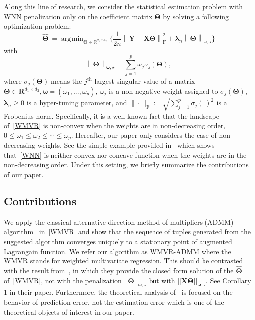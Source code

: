 \documentclass[alpha-refs]{wiley-article}
\DeclareMathOperator*{\argmin}{\arg\!\min}
\begin{document}
Along this line of research, we consider the statistical estimation problem with WNN penalization only on the coefficient matrix $\boldsymbol{\Theta}$ by solving a following optimization problem:
\begin{equation}  \label{WMVR}
    \widehat{\boldsymbol{\Theta}} := \argmin_{\boldsymbol{\Theta}\in\mathbb{R}^{d_{1}\times d_{2}}} \bigg\{ \frac{1}{2n} \left\| \boldsymbol{Y}-\boldsymbol{X}\boldsymbol{\Theta} \right\|_{\text{F}}^{2} + \boldsymbol{\lambda}_{n} \left\| \boldsymbol{\Theta}\right\|_{\boldsymbol{\omega,\star}} \bigg\}
\end{equation}
with
\begin{equation} \label{WNN}
     \left\| \boldsymbol{\Theta} \right\|_{\boldsymbol{\omega,\star}} =\sum^{p}_{j=1} \omega_{j}\sigma_{j}(\boldsymbol{\Theta}),
\end{equation}
where $\sigma_{j}(\boldsymbol{\Theta})$ means the $j^{\text{th}}$ largest singular value of a matrix $\boldsymbol{\Theta} \in \boldsymbol{R}^{d_{1} \times d_{2}}, \boldsymbol{\omega} = (\omega_{1}, ..., \omega_{p}),\ \omega_{j}$ is a non-negative weight assigned to $\sigma_{j}(\boldsymbol{\Theta})$, $\boldsymbol{\lambda}_{n}\geq 0$ is a hyper-tuning parameter, and $\| \cdot \|_{\text{F}}:=\sqrt{\sum_{j=1}^{p}\sigma_{j}(\cdot)^{2}}$ is a Frobenius norm.
Specifically, it is a well-known fact that the landscape of~\eqref{WMVR} is non-convex when the weights are in non-decreasing order, $0\leq\omega_{1}\leq\omega_{2}\leq\cdots\leq\omega_{p}$.
Hereafter, our paper only considers the case of non-decreasing weights.
See the simple example provided in~\citet{chen2013reduced} which shows that~\eqref{WNN} is neither convex nor concave function when the weights are in the non-decreasing order.
Under this setting, we briefly summarize the contributions of our paper.

\subsection{Contributions}
We apply the classical alternative direction method of multipliers (ADMM) algorithm~\citep{boyd2011distributed} in~\eqref{WMVR} and show that the sequence of tuples generated from the suggested algorithm converges uniquely to a stationary point of augmented Lagrangain function. 
We refer our algorithm as WMVR-ADMM where the WMVR stands for weighted multivariate regression.
This should be contrasted with the result from~\citet{chen2013reduced}, in which they provide the closed form solution of the 
$\widehat{\boldsymbol{\Theta}}$ of~\eqref{WMVR}, not with the penalization $||\boldsymbol{\Theta}||_{\boldsymbol{\omega,\star}}$ but 
with $||\boldsymbol{X\Theta}||_{\boldsymbol{\omega,\star}}$.
See Corollary $1$ in their paper.
Furthermore, the theoretical analysis of~\citet{chen2013reduced} is focused on the behavior of prediction error, not the estimation error which is one of the theoretical objects of interest in our paper.
\end{document}
